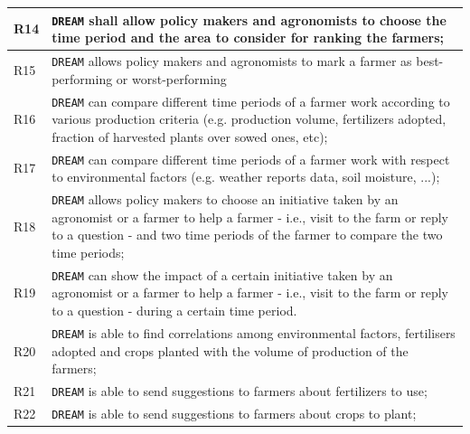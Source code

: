 \documentclass{article}
\begin{document}
\begin{longtable}[c]{|m{0.75cm}|m{11cm}|}
  \hline
R14\label{R} & \verb|DREAM| shall allow policy makers and agronomists to choose the time period and the area to consider for ranking the farmers;\\
  \hline
  R15\label{R} & \verb|DREAM| allows policy makers and agronomists to mark a farmer as best-performing or worst-performing\\
  \hline
R16\label{R} & \verb|DREAM| can compare different time periods of a farmer work according to various production criteria (e.g. production volume, fertilizers adopted, fraction of harvested plants over sowed ones, etc);\\
  \hline
R17\label{R} & \verb|DREAM| can compare different time periods of a  farmer work with respect to environmental factors (e.g. weather reports data, soil moisture, ...);\\
  \hline
R18\label{R} & \verb|DREAM| allows policy makers to choose an initiative taken by an agronomist or a farmer to help a farmer - i.e., visit to the farm or reply to a question - and two time periods of the farmer to compare the two time periods;\\
  \hline
R19\label{R} & \verb|DREAM| can show the impact of a certain initiative taken by an agronomist or a farmer to help a farmer - i.e., visit to the farm or reply to a question - during a certain time period.\\
  \hline
  R20\label{R} & \verb|DREAM| is able to find correlations among environmental factors, fertilisers adopted and crops planted with the volume of production of the farmers;\\
  \hline
  R21\label{R} & \verb|DREAM| is able to send suggestions to farmers about fertilizers to use; \\
  \hline
  R22\label{R} & \verb|DREAM| is able to send suggestions to farmers about crops to plant; \\ 
  \hline
 

\end{longtable}
\end{document}
